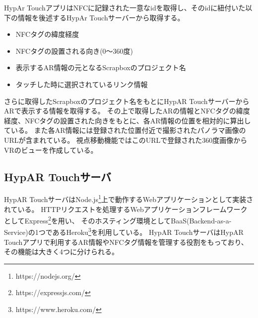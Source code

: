 HypAr TouchアプリはNFCに記録された一意なidを取得し、そのidに紐付いた以下の情報を後述するHypAr Touchサーバーから取得する。
\begin{itemize}
  \item NFCタグの緯度経度
  \item NFCタグの設置される向き(0〜360度)
  \item 表示するAR情報の元となるScrapboxのプロジェクト名
  \item タッチした時に選択されているリンク情報
\end{itemize}
さらに取得したScrapboxのプロジェクト名をもとにHypAR TouchサーバーからARで表示する情報を取得する。
その上で取得したARの情報とNFCタグの緯度経度、NFCタグの設置された向きをもとに、各AR情報の位置を相対的に算出している。
また各AR情報には登録された位置付近で撮影されたパノラマ画像のURLが含まれている。
視点移動機能ではこのURLで登録された360度画像からVRのビューを作成している。

\subsection{HypAR Touchサーバ}
HypAR TouchサーバはNode.js\footnote{\textsf{https://nodejs.org/}}上で動作するWebアプリケーションとして実装されている。
HTTPリクエストを処理するWebアプリケーションフレームワークとしてExpress\footnote{\textsf{https://expressjs.com/}}を用い、
そのホスティング環境としてBaaS(Backend-as-a-Service)の1つであるHeroku\footnote{\textsf{https://www.heroku.com/}}を利用している。
HypAR TouchサーバはHypAR Touchアプリで利用するAR情報やNFCタグ情報を管理する役割をもっており、その機能は大きく4つに分けられる。

